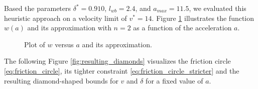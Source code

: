 
Based the parameters $\delta^*=0.910$, $l_{wb}=2.4$, and $a_{max}=11.5$, we evaluated this heuristic approach on a velocity limit of $v^*=14$.
Figure \ref{fig:w_vs_a} illustrates the function $w(a)$ and its approximation with $n=2$ as a function of the acceleration $a$.

\begin{figure}[h!]\centering
	\caption{Plot of $w$ versus $a$ and its approximation.}
	\label{fig:w_vs_a}
\end{figure}

The following Figure \ref{fig:resulting_diamonds} visualizes the friction circle \eqref{eq:friction_circle}, its tighter constraint
\eqref{eq:friction_circle_stricter} and the resulting diamond-shaped bounds for $v$ and $\delta$ for a fixed value of $a$.

